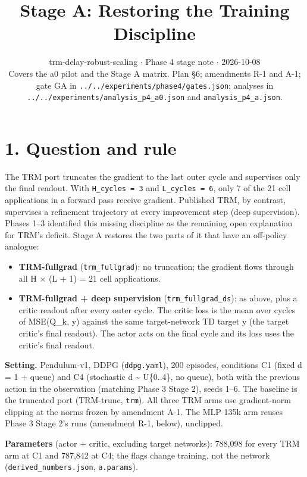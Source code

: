\documentclass[11pt]{article}
\title{Stage A: Restoring the Training Discipline}
\author{}
\date{trm-delay-robust-scaling $\cdot$ Phase 4 stage note $\cdot$ 2026-10-08\\[2pt]Covers the a0 pilot and the Stage A matrix. Plan \S{}6; amendments R-1 and A-1; gate GA in \texttt{.\allowbreak{}.\allowbreak{}/\allowbreak{}.\allowbreak{}.\allowbreak{}/\allowbreak{}experiments/\allowbreak{}phase4/\allowbreak{}gates.\allowbreak{}json}; analyses in \texttt{.\allowbreak{}.\allowbreak{}/\allowbreak{}.\allowbreak{}.\allowbreak{}/\allowbreak{}experiments/\allowbreak{}analysis\_\allowbreak{}p4\_\allowbreak{}a0.\allowbreak{}json} and \texttt{analysis\_\allowbreak{}p4\_\allowbreak{}a.\allowbreak{}json}.}
\begin{document}
\maketitle
\section*{1. Question and rule}



The TRM port truncates the gradient to the last outer cycle and supervises only the final readout. With \texttt{H\_cycles = 3} and \texttt{L\_cycles = 6}, only 7 of the 21 cell applications in a forward pass receive gradient. Published TRM, by contrast, supervises a refinement trajectory at every improvement step (deep supervision). Phases 1--3 identified this missing discipline as the remaining open explanation for TRM's deficit. Stage A restores the two parts of it that have an off-policy analogue:



\begin{itemize}
\item \textbf{TRM-fullgrad} (\texttt{trm\_fullgrad}): no truncation; the gradient flows through all H $\times$ (L + 1) = 21 cell applications.
\item \textbf{TRM-fullgrad + deep supervision} (\texttt{trm\_\allowbreak{}fullgrad\_\allowbreak{}ds}): as above, plus a critic readout after every outer cycle. The critic loss is the mean over cycles of MSE(Q\_k, y) against the same target-network TD target y (the target critic's final readout). The actor acts on the final cycle and its loss uses the critic's final readout.
\end{itemize}



\textbf{Setting.} Pendulum-v1, DDPG (\texttt{ddpg.yaml}), 200 episodes, conditions C1 (fixed d = 1 + queue) and C4 (stochastic d \textasciitilde{} U\{0..4\}, no queue), both with the previous action in the observation (matching Phase 3 Stage 2), seeds 1--6. The baseline is the truncated port (TRM-trunc, \texttt{trm}). All three TRM arms use gradient-norm clipping at the norms frozen by amendment A-1. The MLP 135k arm reuses Phase 3 Stage 2's runs (amendment R-1, below), unclipped.



\textbf{Parameters} (actor + critic, excluding target networks): 788,098 for every TRM arm at C1 and 787,842 at C4; the flags change training, not the network (\texttt{derived\_\allowbreak{}numbers.\allowbreak{}json}, \texttt{a.params}).
\end{document}
